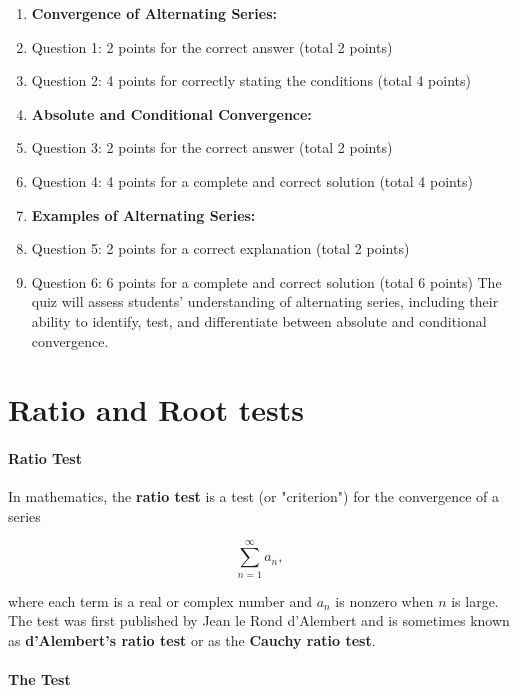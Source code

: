 \begin{enumerate}
    \item \textbf{Convergence of Alternating Series:}
    \item Question 1: 2 points for the correct answer (total 2 points)
    \item Question 2: 4 points for correctly stating the conditions (total 4 points)
    \item \textbf{Absolute and Conditional Convergence:}
    \item Question 3: 2 points for the correct answer (total 2 points)
    \item Question 4: 4 points for a complete and correct solution (total 4 points)
    \item \textbf{Examples of Alternating Series:}
    \item Question 5: 2 points for a correct explanation (total 2 points)
    \item Question 6: 6 points for a complete and correct solution (total 6 points) The quiz will assess students' understanding of alternating series, including their ability to identify, test, and differentiate between absolute and conditional convergence.
\end{enumerate}

\section{Ratio and Root tests}
\label{sec:ratio-and-root-tests}

\paragraph{Ratio Test}



In mathematics, the \textbf{ratio test} is a test (or "criterion") for the convergence of a series



$$\sum _{n=1}^\infty a _n,$$



where each term is a real or complex number and $a _n$ is nonzero when $n$ is large. The test was first published by Jean le Rond d'Alembert and is sometimes known as \textbf{d'Alembert's ratio test} or as the \textbf{Cauchy ratio test}.



\paragraph{The Test}



